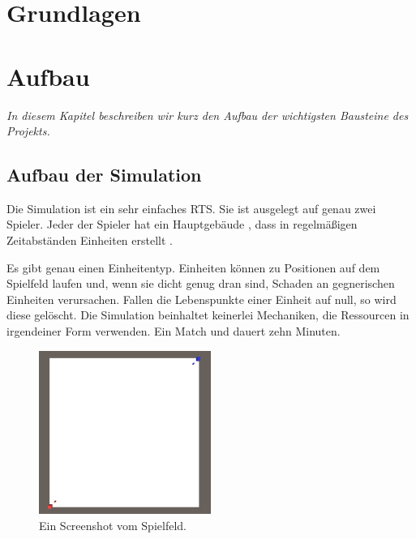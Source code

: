 \documentclass[
	12pt,
	a4paper,
	BCOR10mm,
	DIV14,
	headsepline,
	usegeometry,
]{scrreprt}
\begin{document}
\chapter{Grundlagen}
\label{basics}



\chapter{Aufbau}
\label{Aufbau}

\textit{%
In diesem Kapitel beschreiben wir kurz den Aufbau der wichtigsten Bausteine des Projekts.
}

\bigskip



\section{Aufbau der Simulation}
Die Simulation ist ein sehr einfaches RTS. 
Sie ist ausgelegt auf genau zwei Spieler. 
Jeder der Spieler hat ein Hauptgebäude , dass in regelmäßigen Zeitabständen Einheiten  erstellt . 

Es gibt genau einen Einheitentyp. 
 Einheiten können zu Positionen auf dem Spielfeld laufen und, wenn sie dicht genug dran sind, Schaden an gegnerischen Einheiten verursachen. 
Fallen die Lebenspunkte einer Einheit auf null, so wird diese gelöscht.
Die Simulation beinhaltet keinerlei Mechaniken, die Ressourcen in irgendeiner Form verwenden.
Ein Match  und dauert zehn Minuten.

\begin{figure}[h]
	\centering
	\includegraphics[width = 0.5\textwidth]{Spielfeld.png}
	\caption{Ein Screenshot vom Spielfeld.}
	\label{Spielfeld}
\end{figure} 
\end{document}
